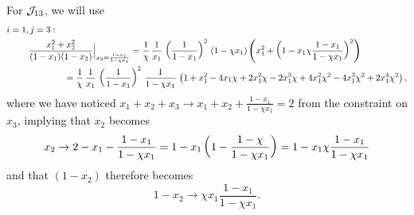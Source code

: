 For \(\mathcal{J}_{13}\), we will use
%
\begin{align}
    i=1,&\,j=3:\notag
    \\
    \label{eq:constrained_integrand_13}
    &\frac{x_1^2 + x_2^2}{(1-x_1)(1-x_2)}
    \Big|_{x_3 = \frac{1-x_1}{1-\chi x_1}}
    =
    \frac{1}{\chi}\,
    \frac{1}{x_1}\,
    \le(\frac{1}{1-x_1}\ri)^2\,
    \le(1 - \chi x_1\ri)
    \le(
        x_1^2 + \le(1 - x_1 \chi \frac{1-x_1}{1 - \chi x_1}\ri)^2
    \ri)
    \\
    &
    \qquad\qquad
    =
    \frac{1}{\chi}\,
    \frac{1}{x_1}\,
    \le(\frac{1}{1-x_1}\ri)^2\,
    \frac{1}{1 - \chi x_1}\,
    \le(
        1 + x_1^2 - 4 x_1 \chi + 2 x_1^2 \chi - 2 x_1^3 \chi + 4 x_1^2 \chi^2 - 4 x_1^3 \chi^2 + 2 x_1^4 \chi^2
    \ri)
    \notag
    ,
\end{align}
where we have noticed \(
    x_1 + x_2 + x_3
    \to
    x_1 + x_2 + \frac{1-x_1}{1-\chi x_1}
    =
    2
\) from the constraint on \(x_3\), implying that \(x_2\) becomes
\begin{equation}
    x_2 \to 2 - x_1 - \frac{1-x_1}{1-\chi x_1}
    =
    1 - x_1 \left(
        1 - \frac{1-\chi}{1 - \chi x_1}
    \right)
    =
    1 - x_1 \chi \frac{1-x_1}{1 - \chi x_1}
\end{equation}
and that \((1-x_2)\) therefore becomes
\begin{equation}
    1 - x_2
    \to
    \chi x_1 \frac{1 - x_1}{1 - \chi x_1}
    .
\end{equation}


